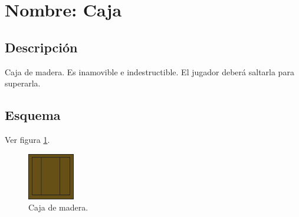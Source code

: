 \section{Nombre: Caja} \label{obs.caja}
\subsection{Descripción}
Caja de madera. Es inamovible e indestructible. El jugador deberá saltarla para superarla. 
\subsection{Esquema}
Ver figura \ref{fig:caja}.
\begin{figure}
	\centering
	\includegraphics[height=0.1 \textheight]{Imagenes/caja}
	\caption{Caja de madera.}
	\label{fig:caja}
\end{figure}
